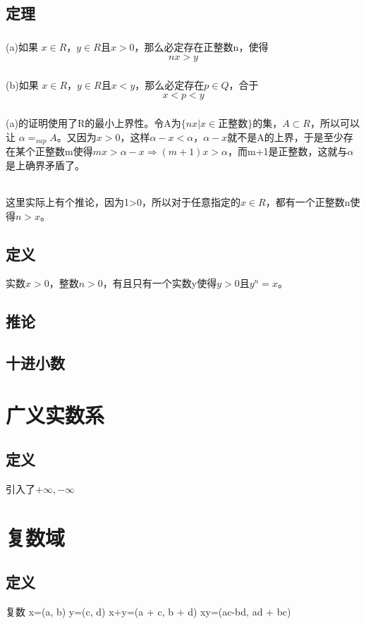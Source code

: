\section{定理}
\paragraph{}(a)如果 \(x \in R\)，\(y \in R\)且$ x > 0 $，那么必定存在正整数n，使得 $$ nx > y $$
\paragraph{}(b)如果 \(x \in R\)，\(y \in R\)且$ x < y $，那么必定存在$p \in Q$，合于 $$ x < p < y $$
\paragraph{}(a)的证明使用了R的最小上界性。令A为$\{ nx| x\in$正整数$\}$的集，$ A\subset R $，所以可以让 $ \alpha = _{sup}A $。又因为$x > 0$，这样$\alpha - x < \alpha$，$\alpha -x$就不是A的上界，于是至少存在某个正整数m使得$mx > \alpha-x \Rightarrow (m+1)x > \alpha$，而m+1是正整数，这就与$\alpha$是上确界矛盾了。
\subparagraph{}这里实际上有个推论，因为1>0，所以对于任意指定的$ x \in R $，都有一个正整数n使得$n>x$。
\section{定义} 实数$x > 0$，整数$n > 0$，有且只有一个实数y使得$y > 0$且$y^n = x$。
\section*{推论}
\section{十进小数}
\subparagraph*{}
\chapter*{广义实数系}
\section{定义}引入了$ +\infty, -\infty $
\subparagraph*{}
\chapter*{复数域}
\section{定义}复数
x=(a, b) y=(c, d)
x+y=(a + c, b + d)
xy=(ac-bd, ad + bc)

